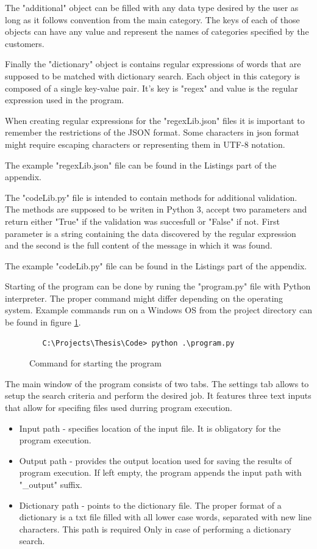 \documentclass[a4paper,twoside,12pt]{book}
\begin{document}
The "additional" object can be filled with any data type desired by the user as long 
as it follows convention from the main category. The keys of each of those objects can have any value and represent the names of categories
specified by the customers.

Finally the "dictionary" object is contains regular expressions of words that are supposed to be matched with dictionary search. Each object in this category 
is composed of a single key-value pair. It's key is "regex" and value is the regular expression used in the program. 

When creating regular expressions for the "regexLib.json" files it is important to remember the restrictions of the 
JSON format. Some characters in json format might require escaping characters or  representing them in UTF-8 notation.

The example "regexLib.json" file can be found in the Listings part of the appendix.

The "codeLib.py" file is intended to contain methods for additional validation. The methods are supposed
to be writen in Python 3, accept two parameters and return either "True" if the validation was succesfull
or "False" if not. First parameter is a string containing the data discovered by the regular expression and
the second is the full content of the message in which it was found.

The example "codeLib.py" file can be found in the Listings part of the appendix.

Starting of the program can be done by runing the "program.py" file with Python interpreter. The proper command
might differ depending on the operating system. Example commands run on a Windows OS from the project directory
can be found in figure \ref{fig:startCommand}.

\begin{figure}
   \centering
   \begin{lstlisting}
   C:\Projects\Thesis\Code> python .\program.py
   \end{lstlisting}
   \caption{Command for starting the program}
   \label{fig:startCommand}
\end{figure}

The main window of the program consists of two tabs. The settings tab allows to setup the search criteria and perform
the desired job. It features three text inputs that allow for specifing files used durring program execution.

\begin{itemize}
   \item Input path - specifies location of the input file. It is obligatory for the program execution.
   \item Output path - provides the output location used for saving the results of program execution. 
   If left empty, the program appends the input path with "\_output" suffix. 
   \item Dictionary path - points to the dictionary file. The proper format of a dictionary
   is a txt file filled with all lower case words, separated with new line characters. This path is required
   Only in case of performing a dictionary search.
\end{itemize}
\end{document}
